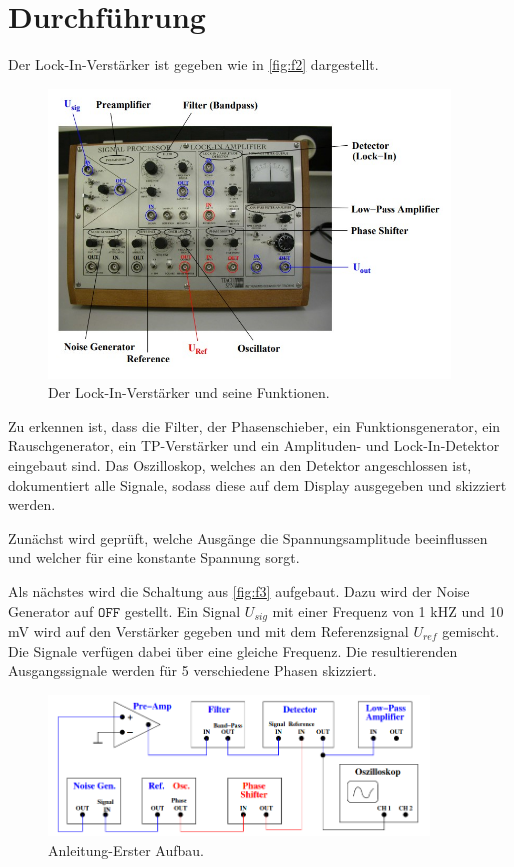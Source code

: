 \section{Durchführung}
\label{sec:Durchführung}

Der Lock-In-Verstärker ist gegeben wie in \autoref{fig:f2} dargestellt.
\begin{figure}[H]
    \centering
        \centering
        \includegraphics[width=0.95\textwidth]{Bilder/LIV.jpg}
        \caption{Der Lock-In-Verstärker und seine Funktionen. \cite{anleitung2}}
    \hfill
    \label{fig:f2}
\end{figure}
\noindent Zu erkennen ist, dass die Filter, der Phasenschieber, ein
Funktionsgenerator, ein Rauschgenerator, ein TP-Verstärker und ein Amplituden-
und Lock-In-Detektor eingebaut sind. Das Oszilloskop, welches an den Detektor
angeschlossen ist, dokumentiert alle Signale, sodass diese auf dem Display
ausgegeben und skizziert werden.
\par\vspace{0.5em}
\noindent Zunächst wird geprüft, welche Ausgänge die Spannungsamplitude 
beeinflussen und welcher für eine konstante Spannung sorgt.
\par\vspace{0.5em}
\noindent Als nächstes wird die Schaltung aus \autoref{fig:f3} aufgebaut. Dazu
wird der Noise Generator auf $\texttt{OFF}$ gestellt. Ein Signal $U_{sig}$ mit einer
Frequenz von 1 kHZ und 10 mV wird auf den Verstärker gegeben und mit dem 
Referenzsignal $U_{ref}$ gemischt. Die Signale verfügen dabei über eine 
gleiche Frequenz. Die resultierenden Ausgangssignale werden für 5 verschiedene 
Phasen skizziert.
\begin{figure}[H]
    \centering
        \includegraphics[width=0.9\textwidth]{Bilder/baute1.png}
        \caption{Anleitung-Erster Aufbau. \cite{anleitung2}}
    \hfill
    \label{fig:f3}
\end{figure}
